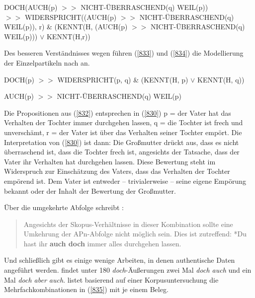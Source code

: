 \begin{exe}
	\ex\label{832}
	DOCH(AUCH(p) $>>$ NICHT-ÜBERRASCHEND(q) WEIL(p))\\
	$>>$ WIDERSPRICHT((AUCH(p) $>>$ NICHT-ÜBERRASCHEND(q)\\
	 WEIL(p)), r) \& (KENNT(H, (AUCH(p) $>>$ NICHT-ÜBERRASCHEND(q)\\ WEIL(p))) $\vee$ KENNT(H,r))
\end{exe}	
Des besseren Verständnisses wegen führen (\ref{833}) und (\ref{834}) die Modellierung der Einzelpartikeln nach \citet{Rinas2007} an.
\begin{exe}
	\ex\label{833}
	DOCH(p) $>>$ WIDERSPRICHT(p, q) \& (KENNT(H, p) $\vee$ KENNT(H, q))
\end{exe}	
\vspace{-0.65cm}	
\begin{exe}
	\ex\label{834}
	AUCH(p) $>>$ NICHT-ÜBERRASCHEND(q) WEIL(p)
	\hfill\hbox{\citet[134/136]{Rinas2007}}	
\end{exe}
Die Propositionen aus (\ref{832}) entsprechen in (\ref{830}) p = der Vater hat das Verhalten der Tochter immer durchgehen lassen, q = die Tochter ist frech und unverschämt, r = der Vater ist über das Verhalten seiner Tochter empört. Die Interpretation von (\ref{830}) ist dann: Die Großmutter drückt aus, dass es nicht überraschend ist, dass die Tochter frech ist, angesichts der Tatsache, dass der Vater ihr Verhalten hat durchgehen lassen. Diese Bewertung steht im Widerspruch zur Einschätzung des Vaters, dass das Verhalten der Tochter empörend ist. Dem Vater ist entweder -- trivialerweise -- seine eigene Empörung bekannt oder der Inhalt der Bewertung der Großmutter.

Über die umgekehrte Abfolge schreibt \citet[149]{Rinas2007}:
\begin{quotation}
Angesichts der Skopus-Verhältnisse in dieser Kombination sollte eine Um\-kehrung der APn-Abfolge nicht möglich sein. Dies ist zutreffend: *Du hast ihr \textbf{auch doch} immer alles durchgehen lassen.
\end{quotation}
Und schließlich gibt es einige wenige Arbeiten, in denen authentische Daten angeführt werden. \citet[233]{Rath1975} findet unter 180 \textit{doch}-Äußerungen zwei Mal \textit{doch auch} und ein Mal \textit{doch aber auch}. \citet[53]{Rudolph1983} listet basierend auf einer Korpusuntersuchung die Mehrfachkombinationen in (\ref{835}) mit je einem Beleg.
			
